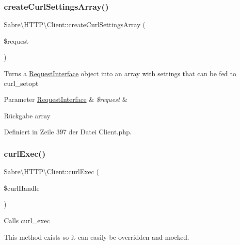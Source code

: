 \subsubsection{\texorpdfstring{create\+Curl\+Settings\+Array()}{createCurlSettingsArray()}}
{\footnotesize\ttfamily Sabre\textbackslash{}\+H\+T\+T\+P\textbackslash{}\+Client\+::create\+Curl\+Settings\+Array (\begin{DoxyParamCaption}\item[{\mbox{\hyperlink{interface_sabre_1_1_h_t_t_p_1_1_request_interface}{Request\+Interface}}}]{\$request }\end{DoxyParamCaption})\hspace{0.3cm}{\ttfamily [protected]}}

Turns a \mbox{\hyperlink{interface_sabre_1_1_h_t_t_p_1_1_request_interface}{Request\+Interface}} object into an array with settings that can be fed to curl\+\_\+setopt


\begin{DoxyParams}[1]{Parameter}
\mbox{\hyperlink{interface_sabre_1_1_h_t_t_p_1_1_request_interface}{Request\+Interface}} & {\em \$request} & \\
\hline
\end{DoxyParams}
\begin{DoxyReturn}{Rückgabe}
array 
\end{DoxyReturn}


Definiert in Zeile 397 der Datei Client.\+php.

\mbox{\label{class_sabre_1_1_h_t_t_p_1_1_client_a90a7e064ac5f70e81caad0dbd1984d8f}} 
\subsubsection{\texorpdfstring{curl\+Exec()}{curlExec()}}
{\footnotesize\ttfamily Sabre\textbackslash{}\+H\+T\+T\+P\textbackslash{}\+Client\+::curl\+Exec (\begin{DoxyParamCaption}\item[{}]{\$curl\+Handle }\end{DoxyParamCaption})\hspace{0.3cm}{\ttfamily [protected]}}

Calls curl\+\_\+exec

This method exists so it can easily be overridden and mocked.


